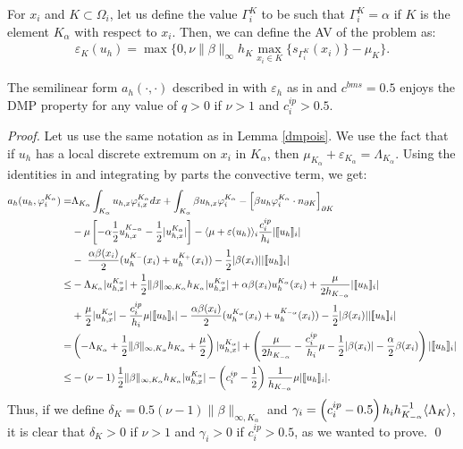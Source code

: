 For $x_i$ and $K\subset\Omega_i$, let us define the value $\Gamma_i^K$ to be such that $\Gamma_i^K = \alpha$ if $K$ is the element $K_\alpha$ with respect to $x_i$. Then, we can define the AV of the problem as:
\begin{align}\label{eq-ad}
\varepsilon_K(u_h) = \max \{ 0, \nu \|\beta\|_\infty h_{K} \max_{x_i\in K} \{s_{\Gamma_i^K}(x_i)\} - \mu_K\}.
\end{align} 


\begin{theorem}\label{thm-DMPAD}
The semilinear form $a_h(\cdot,\cdot)$ described in  with $\varepsilon_h$ as in  and $c^{bms} = 0.5$ enjoys the DMP property for any value of $q>0$ if $\nu>1$ and $c_i^{ip}>0.5$.
\end{theorem}

\begin{proof}
Let us use the same notation as in Lemma \ref{dmpois}. We use the fact that if $u_h$ has a local discrete extremum on $x_i$ in $K_\alpha$, then  $\mu_{K_\alpha} + \varepsilon_{K_\alpha} = \Lambda_{K_\alpha}$. Using the identities in  and integrating by parts the convective term, we get:
\begin{align*}
a_h(u_h,\varphi_i^{K_\alpha}) = & \Lambda_{K_\alpha} \int_{K_\alpha} u_{h,x}\varphi_{i,x}^{K_\alpha} dx + \int_{K_\alpha} \beta  u_{h,x} \varphi_{i}^{K_\alpha} - \left[\beta u_h \varphi_i^{K_\alpha} \cdot n_{\partial K}\right]_{\partial K} \\
& - \mu  \left[
-\alpha\half u_{h,x}^{K_{-\alpha}} - \frac{1}{2}|u_{h,x}^{K_{\alpha}}|  \right] -  \meanhar{\mu+\varepsilon(u_h)}_i  \frac{c^{ip}_i}{ {h}_i} |\jump{u_h}_i| \\
&- \  \frac{\alpha\beta(x_i)}{2}(u_h^{K_-}(x_i)+u_h^{K_+}(x_i)) -   \half|\beta(x_i)| |\jump{u_h}_i|\\
\leq & - \Lambda_{K_\alpha} | u_{h,x}^{K_{\alpha}}| + \half \|\beta\|_{\infty,K_\alpha}h_{K_\alpha} | u_{h,x}^{K_{\alpha}}| + \alpha \beta(x_i) u_h^{K_\alpha}(x_i) + \frac{\mu}{2h_{K_{-\alpha}}}|\jump{ u_{h}}_i| \\
& + \frac{\mu}{2}| u_{h,x}^{K_{\alpha}}|  - \frac{c^{ip}_i}{ {h}_i}\mu |\jump{u_h}_i|
 - \frac{\alpha\beta(x_i)}{2}(u_h^{K_\alpha}(x_i)+u_h^{K_{-\alpha}}(x_i)) -   \half |\beta(x_i)| |\jump{u_h}_i|\\
= & \left( - \Lambda_{K_\alpha} +  \half \|\beta\|_{\infty,K_\alpha}h_{K_\alpha} + \frac{\mu}{2} \right) | u_{h,x}^{K_{\alpha}}| + \left(\frac{\mu}{2h_{K_{-\alpha}}} - \frac{c^{ip}_i}{ {h}_i}\mu  -   \half |\beta(x_i)| - \frac{\alpha}{2}\beta(x_i) \right)| \jump{u_h}_i| \\
\leq & -\left(\nu-1\right)\half \|\beta\|_{\infty,K_\alpha}h_{K_\alpha}  | u_{h,x}^{K_{\alpha}}| - \left(c^{ip}_i - \frac{1}{2} \right)\frac{1}{h_{K_{-\alpha}}}\mu | \jump{u_h}_i|. %
\end{align*} 
Thus, if we define $\delta_{K}=0.5\left(\nu-1\right) \|\beta\|_{\infty,K_\alpha}$ and $\gamma_i=\left(c^{ip}_i- 0.5 \right)h_i h^{-1}_{K_{-\alpha}}\langle\Lambda_{K}\rangle$, it is clear that $\delta_K>0$ if $\nu>1$ and $\gamma_i>0$ if $c_i^{ip}>0.5$, as we wanted to prove. \qed
\end{proof}

